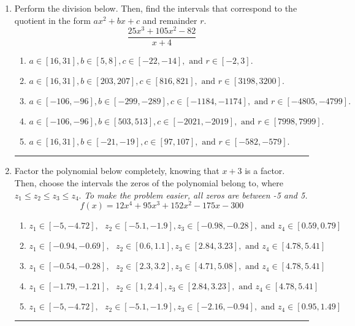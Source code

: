 \documentclass[14pt]{extbook}
\newcommand{\litem}[1]{\item#1\hspace*{-1cm}\rule{\textwidth}{0.4pt}}
\begin{document}
\begin{enumerate}
{\begin{enumerate}[label=\Alph*.]
\end{enumerate} }
\litem{
Perform the division below. Then, find the intervals that correspond to the quotient in the form $ax^2+bx+c$ and remainder $r$.\[ \frac{25x^{3} +105 x^{2} -82}{x + 4} \]\begin{enumerate}[label=\Alph*.]
\item \( a \in [16, 31], b \in [5, 8], c \in [-22, -14], \text{ and } r \in [-2, 3]. \)
\item \( a \in [16, 31], b \in [203, 207], c \in [816, 821], \text{ and } r \in [3198, 3200]. \)
\item \( a \in [-106, -96], b \in [-299, -289], c \in [-1184, -1174], \text{ and } r \in [-4805, -4799]. \)
\item \( a \in [-106, -96], b \in [503, 513], c \in [-2021, -2019], \text{ and } r \in [7998, 7999]. \)
\item \( a \in [16, 31], b \in [-21, -19], c \in [97, 107], \text{ and } r \in [-582, -579]. \)

\end{enumerate} }
\litem{
Factor the polynomial below completely, knowing that $x+3$ is a factor. Then, choose the intervals the zeros of the polynomial belong to, where $z_1 \leq z_2 \leq z_3 \leq z_4$. \textit{To make the problem easier, all zeros are between -5 and 5.}\[ f(x) = 12x^{4} +95 x^{3} +152 x^{2} -175 x -300 \]\begin{enumerate}[label=\Alph*.]
\item \( z_1 \in [-5, -4.72], \text{   }  z_2 \in [-5.1, -1.9], z_3 \in [-0.98, -0.28], \text{   and   } z_4 \in [0.59, 0.79] \)
\item \( z_1 \in [-0.94, -0.69], \text{   }  z_2 \in [0.6, 1.1], z_3 \in [2.84, 3.23], \text{   and   } z_4 \in [4.78, 5.41] \)
\item \( z_1 \in [-0.54, -0.28], \text{   }  z_2 \in [2.3, 3.2], z_3 \in [4.71, 5.08], \text{   and   } z_4 \in [4.78, 5.41] \)
\item \( z_1 \in [-1.79, -1.21], \text{   }  z_2 \in [1, 2.4], z_3 \in [2.84, 3.23], \text{   and   } z_4 \in [4.78, 5.41] \)
\item \( z_1 \in [-5, -4.72], \text{   }  z_2 \in [-5.1, -1.9], z_3 \in [-2.16, -0.94], \text{   and   } z_4 \in [0.95, 1.49] \)

\end{enumerate} }
\end{enumerate}
\end{document}
